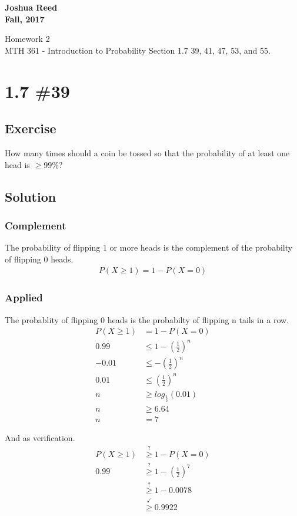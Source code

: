 \documentclass[12pt]{article}
\begin{document}
{%
  \large \bfseries 
  Joshua Reed \\
  Fall, 2017 \\
  \begin{center}
    {\huge Homework 2}\\
    MTH 361 - Introduction to Probability%
  Section 1.7 39, 41, 47, 53, and 55.
  \end{center}}
 
 
\section{1.7 \#39} 
\subsection{Exercise}How many times should a coin be tossed so that the probability of at least one head is $\geq 99\%$?

\subsection{Solution}
\subsubsection{Complement}
The probability of flipping 1 or more heads is the complement of the probabilty of flipping 0 heads.
\begin{align*}
P(X\geq 1) = 1-P(X=0)
\end{align*}

\subsubsection{Applied}
The probablity of flipping 0 heads is the probabilty of flipping n tails in a row.
\begin{align*}
P(X\geq 1) &= 1-P(X=0)\\
0.99 &\leq 1-(\frac{1}{2})^n\\
-0.01 &\leq -(\frac{1}{2})^n\\
0.01 &\leq (\frac{1}{2})^n\\
n &\geq log_\frac{1}{2}(0.01) \\
n &\geq 6.64 \\
n & = 7 
\end{align*}

And as verification.
\begin{align*}
P(X\geq 1) & \stackrel{?}{\geq} 1-P(X=0)\\
0.99& \stackrel{?}{\geq} 1-(\frac{1}{2})^7\\
& \stackrel{?}{\geq} 1-0.0078\\
& \stackrel{\checkmark}{\geq} 0.9922
\end{align*}
\end{document}
